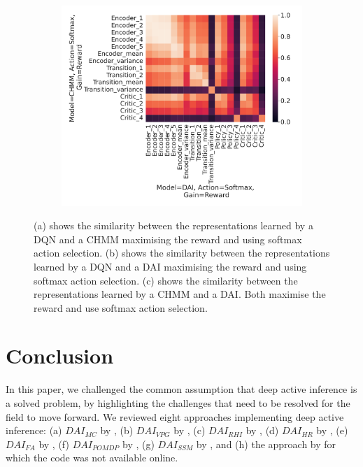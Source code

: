 \documentclass[twoside,11pt]{article}
\begin{document}
\begin{figure}[ht!]
\begin{subfigure}{.3\textwidth}
    \end{subfigure}%
    \begin{subfigure}{.3\textwidth}
        \centering
        \includegraphics[draft=false,width=\linewidth]{cka_figures/CKA_chmm_109_dai_145}
        \caption{}\label{sfig:cka-chmm-dai}
    \end{subfigure}%

    \caption{(a) shows the similarity between the representations learned by a DQN and a CHMM maximising the reward and using softmax action selection. (b) shows the similarity between the representations learned by a DQN and a DAI maximising the reward and using softmax action selection. (c) shows the similarity between the representations learned by a CHMM and a DAI. Both maximise the reward and use softmax action selection.
    }
    \label{fig:cka-dai}
\end{figure}

\section{Conclusion} \label{sec:conclusion}


In this paper, we challenged the common assumption that deep active inference is a solved problem, by highlighting the challenges that need to be resolved for the field to move forward. We reviewed eight approaches implementing deep active inference: (a) $DAI_{MC}$ by \citet{DeepAIwithMCMC}, (b) $DAI_{VPG}$ by \citet{DeepAI}, (c) $DAI_{RHI}$ by \citet{rood2020deep}, (d) $DAI_{HR}$ by \citet{sancaktar2020endtoend}, (e) $DAI_{FA}$ by \citet{DAI_Kai}, (f) $DAI_{POMDP}$ by \citet{DAI_POMDP}, (g) $DAI_{SSM}$ by \citet{ccatal2020learning}, and (h) the approach by \citet{schneider2022active} for which the code was not available online.
\end{document}
